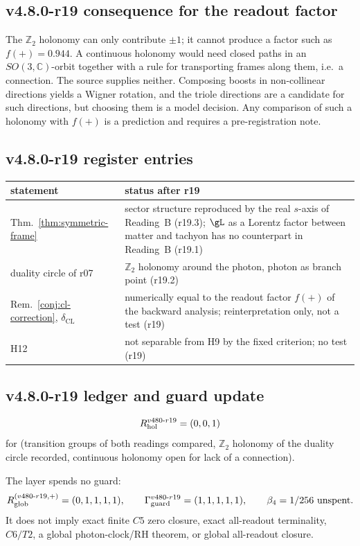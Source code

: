 \subsection*{v4.8.0-r19 consequence for the readout factor}
\label{subsec:v480-r19-readout-factor}

The \(\mathbb Z_2\) holonomy can only contribute \(\pm1\); it cannot produce a factor such as \(f(+)=0.944\).  A
continuous holonomy would need closed paths in an \(SO(3,\mathbb C)\)-orbit together with a rule for transporting
frames along them, i.e.\ a connection.  The source supplies neither.  Composing boosts in non-collinear directions
yields a Wigner rotation, and the triole directions are a candidate for such directions, but choosing them is a model
decision.  Any comparison of such a holonomy with \(f(+)\) is a prediction and requires a pre-registration note.

\subsection*{v4.8.0-r19 register entries}
\label{subsec:v480-r19-register}

\begin{center}
\small
\begin{tabular}{@{}>{\raggedright\arraybackslash}p{}>{\raggedright\arraybackslash}p{}@{}}
\toprule
statement & status after r19\\
\midrule
Thm.~\ref{thm:symmetric-frame} & sector structure reproduced by the real \(s\)-axis of Reading~B (r19.3); \(\gL\) as a Lorentz factor between matter and tachyon has no counterpart in Reading~B (r19.1)\\
duality circle of r07 & \(\mathbb Z_2\) holonomy around the photon, photon as branch point (r19.2)\\
Rem.~\ref{conj:cl-correction}, \(\delta_{\mathrm{CL}}\) & numerically equal to the readout factor \(f(+)\) of the backward analysis; reinterpretation only, not a test (r19)\\
H12 & not separable from H9 by the fixed criterion; no test (r19)\\
\bottomrule
\end{tabular}
\end{center}

\subsection*{v4.8.0-r19 ledger and guard update}
\label{subsec:v480-r19-ledger-guard}

\[
R_{\rm hol}^{v480\text{-}r19}=(0,0,1)
\]
for (transition groups of both readings compared, \(\mathbb Z_2\) holonomy of the duality circle recorded,
continuous holonomy open for lack of a connection).

The layer spends no guard:
\[
R_{\rm glob}^{(v480\text{-}r19,+)}=(0,1,1,1,1),
\qquad
\Gamma_{\rm guard}^{v480\text{-}r19}=(1,1,1,1,1),
\qquad
\beta_4=1/256\ \text{unspent}.
\]
It does not imply exact finite \(C5\) zero closure, exact all-readout terminality,
\(C6/T2\), a global photon-clock/RH theorem, or global all-readout closure.

